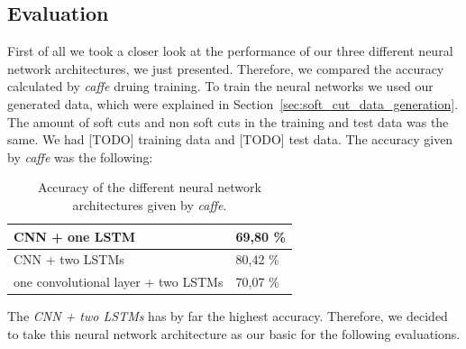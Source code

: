 \subsection{Evaluation}
\label{sec:soft_cut_evaluation}

First of all we took a closer look at the performance of our three different neural network architectures, we just presented.
Therefore, we compared the accuracy calculated by \textit{caffe} druing training.
To train the neural networks we used our generated data, which were explained in Section~\ref{sec:soft_cut_data_generation}.
The amount of soft cuts and non soft cuts in the training and test data was the same.
We had [TODO] training data and [TODO] test data.
The accuracy given by \textit{caffe} was the following:
\begin{table}[ht]
	\centering
	\begin{tabular}{l|l}
	CNN + one LSTM                      & 69,80 \% \\ \hline
	CNN + two LSTMs                     & 80,42 \% \\ \hline
	one convolutional layer + two LSTMs & 70,07 \% \\
	\end{tabular}
	\caption{Accuracy of the different neural network architectures given by \textit{caffe}.}
	\label{tab:caffe_accurary}
\end{table}
The \textit{CNN + two LSTMs} has by far the highest accuracy.
Therefore, we decided to take this neural network architecture as our basic for the following evaluations.

